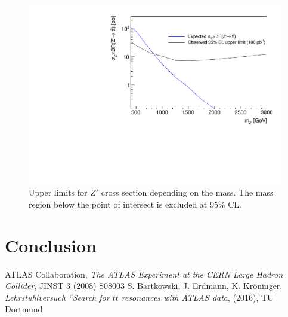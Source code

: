 \begin{figure}
 \includegraphics[width=\textwidth]{../pics/limits.pdf}
 \caption{Upper limits for $Z'$ cross section depending on the mass. The mass region below the point of intersect is excluded at 95\% CL.}
 \label{pic:limits}
\end{figure}




\section{Conclusion}

 \begin{thebibliography}{WissOnl}
 	 ATLAS Collaboration, \textit{The ATLAS Experiment at the CERN Large Hadron Collider}, JINST 3 (2008) S08003
 	 S. Bartkowski, J. Erdmann, K. Kröninger, \textit{Lehrstuhlversuch ``Search for $t\bar t$ resonances with ATLAS data}, (2016), TU Dortmund
 \end{thebibliography}





